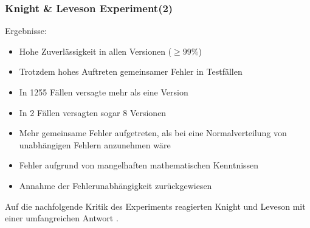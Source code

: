 %
%
\begin{frame}
	\frametitle{ Knight \& Leveson Experiment(2)}
	
	Ergebnisse:
	\begin{itemize}
		\item Hohe Zuverlässigkeit in allen Versionen ($\geq 99\%$)
		\item Trotzdem hohes Auftreten gemeinsamer Fehler in Testfällen
		\item In 1255 Fällen versagte mehr als eine Version
		\item In 2 Fällen versagten sogar 8 Versionen
		\item Mehr gemeinsame Fehler aufgetreten, als bei eine Normalverteilung von unabhängigen Fehlern anzunehmen wäre
		\item Fehler aufgrund von mangelhaften mathematischen Kenntnissen
		\item Annahme der Fehlerunabhängigkeit zurückgewiesen		
	\end{itemize}
	\pause
	
	Auf die nachfolgende Kritik des Experiments reagierten Knight und Leveson mit einer umfangreichen Antwort \cite{reply_critics}.
	
\end{frame}

